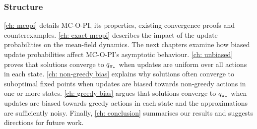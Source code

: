 


\subsubsection{Structure}


\autoref{ch: mcopi} details MC-O-PI, its properties, existing convergence proofs and counterexamples.
\autoref{ch: exact mcopi} describes the impact of the update probabilities on the mean-field dynamics.
The next chapters examine how biased update probabilities affect MC-O-PI's asymptotic behaviour.
\autoref{ch: unbiased} proves that solutions converge to $q_{{\pi}_*}$ when updates are uniform over all actions in each state.
\autoref{ch: non-greedy bias} explains why solutions often converge to suboptimal fixed points when updates are biased towards non-greedy actions in one or more states.
\autoref{ch: greedy bias} argues that solutions converge to $q_{{\pi}_*}$ when updates are biased towards greedy actions in each state and the approximations are sufficiently noisy.
Finally, \autoref{ch: conclusion} summarises our results and suggests directions for future work.
